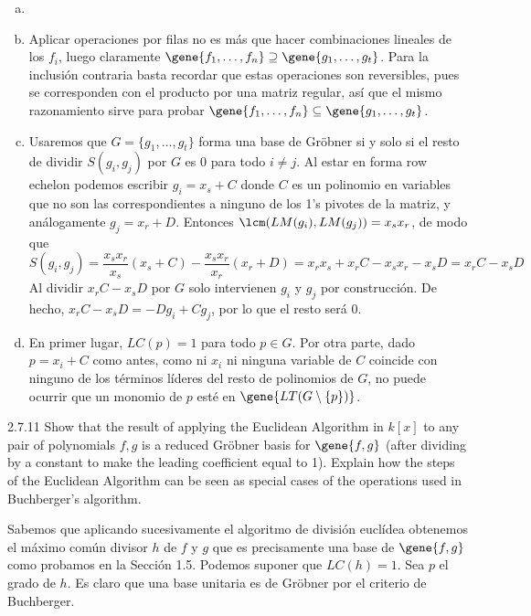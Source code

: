 \documentclass[twoside]{article}
\begin{document}
\begin{solucion}
\begin{enumerate}[a.]
\item[]
\item Aplicar operaciones por filas no es más que hacer combinaciones lineales de los $f_i$, luego claramente $\gene{f_1,\dots, f_n}\supseteq \gene{ g_1 ,\dots , g_t}$. Para la inclusión contraria basta recordar que estas operaciones son reversibles, pues se corresponden con el producto por una matriz regular, así que el mismo razonamiento sirve para probar  $\gene{f_1,\dots, f_n}\subseteq \gene{ g_1 ,\dots , g_t}$.

\item Usaremos que $G=\{g_1 , \dots, g_t\}$ forma una base de Gröbner si y solo si el resto de dividir $S(g_i,g_j)$ por $G$ es 0 para todo $i\neq j$. Al estar en forma row echelon podemos escribir $g_i=x_s+C$ donde $C$ es un polinomio en variables que no son las correspondientes a ninguno de los 1's pivotes de la matriz, y análogamente $g_j=x_r+D$. Entonces $\lcm(LM(g_i),LM(g_j))=x_sx_r$, de modo que 
\[
S(g_i,g_j)=\frac{x_sx_r}{x_s}(x_s+C)-\frac{x_sx_r}{x_r}(x_r+D)=x_rx_s +x_rC-x_sx_r-x_sD=x_rC-x_sD
\]
Al dividir $x_rC-x_sD$ por $G$ solo intervienen $g_i$ y $g_j$ por construcción. De hecho, $x_rC-x_sD=-Dg_i+Cg_j$, por lo que el resto será 0.

\item En primer lugar, $LC(p)=1$ para todo $p\in G$. Por otra parte, dado $p=x_i+C$ como antes, como ni $x_i$ ni ninguna variable de $C$ coincide con ninguno de los términos líderes del resto de polinomios de $G$, no puede ocurrir que un monomio de $p$ esté en $\gene{LT(G\setminus\{p\})}$. 
\end{enumerate}
\end{solucion}

\newpage

\begin{ejercicio}{2.7.11}
Show that the result of applying the Euclidean Algorithm in $k[x]$ to any pair of polynomials $f , g$ is a reduced Gröbner basis for $\gene{f , g}$ (after dividing by a constant to make the leading coefficient equal to 1). Explain how the steps of the Euclidean Algorithm can be seen as special cases of the operations used in Buchberger’s algorithm.
\end{ejercicio}
\begin{solucion}
Sabemos que aplicando sucesivamente el algoritmo de división euclídea obtenemos el máximo común divisor $h$ de $f$ y $g$ que es precisamente una base de $\gene{f,g}$ como probamos en la Sección 1.5. Podemos suponer que $LC(h)=1$. Sea $p$ el grado de $h$. Es claro que una base unitaria es de Gröbner por el criterio de Buchberger. 
\end{solucion}
\end{document}
